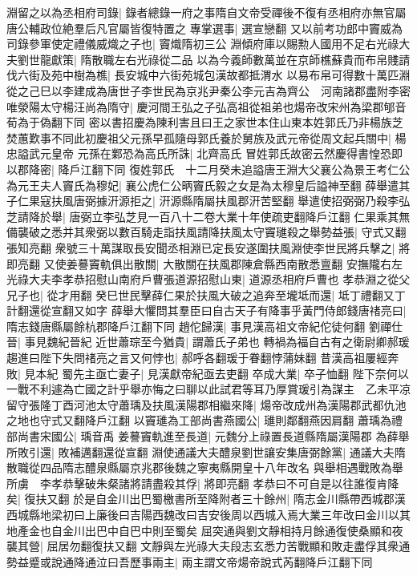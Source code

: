 淵留之以為丞相府司錄|{
	錄者總錄一府之事隋自文帝受禪後不復有丞相府亦無官屬唐公輔政位絶羣后凡官屬皆復特置之}
專掌選事|{
	選宣戀翻}
又以前考功郎中竇威為司錄參軍使定禮儀威熾之子也|{
	竇熾隋初三公}
淵傾府庫以賜勲人國用不足右光祿大夫劉世龍獻策|{
	隋散職左右光祿從二品}
以為今義師數萬並在京師樵蘇貴而布帛賤請伐六街及苑中樹為樵|{
	長安城中六街苑城包漢故都抵渭水}
以易布帛可得數十萬匹淵從之己巳以李建成為唐世子李世民為京兆尹秦公李元吉為齊公　河南諸郡盡附李密唯滎陽太守楊汪尚為隋守|{
	慶河間王弘之子弘高祖從祖弟也煬帝改宋州為梁郡郇音荀為于偽翻下同}
密以書招慶為陳利害且曰王之家世本住山東本姓郭氏乃非楊族芝焚蕙歎事不同此初慶祖父元孫早孤隨母郭氏養於舅族及武元帝從周文起兵關中|{
	楊忠謚武元皇帝}
元孫在鄴恐為高氏所誅|{
	北齊高氏}
冒姓郭氏故密云然慶得書惶恐即以郡降密|{
	降戶江翻下同}
復姓郭氏　十二月癸未追謚唐王淵大父襄公為景王考仁公為元王夫人竇氏為穆妃|{
	襄公虎仁公昞竇氏毅之女是為太穆皇后謚神至翻}
薛舉遣其子仁果寇扶風唐弼據汧源拒之|{
	汧源縣隋屬扶風郡汧苦堅翻}
舉遣使招弼弼乃殺李弘芝請降於舉|{
	唐弼立李弘芝見一百八十二卷大業十年使疏吏翻降戶江翻}
仁果乘其無備襲破之悉并其衆弼以數百騎走詣扶風請降扶風太守竇璡殺之舉勢益張|{
	守式又翻張知亮翻}
衆號三十萬謀取長安聞丞相淵已定長安遂圍扶風淵使李世民將兵擊之|{
	將即亮翻}
又使姜謩竇軌俱出散關|{
	大散關在扶風郡陳倉縣西南散悉亶翻}
安撫隴右左光祿大夫李孝恭招慰山南府戶曹張道源招慰山東|{
	道源丞相府戶曹也}
孝恭淵之從父兄子也|{
	從才用翻}
癸巳世民擊薛仁果於扶風大破之追奔至壠坻而還|{
	坻丁禮翻又丁計翻還從宣翻又如字}
薛舉大懼問其羣臣曰自古天子有降事乎黃門侍郎錢唐禇亮曰|{
	隋志錢唐縣屬餘杭郡降戶江翻下同}
趙佗歸漢|{
	事見漢高祖文帝紀佗徒何翻}
劉禪仕晉|{
	事見魏紀晉紀}
近世蕭琮至今猶貴|{
	謂蕭氏子弟也}
轉禍為福自古有之衛尉卿郝瑗趨進曰陛下失問禇亮之言又何悖也|{
	郝呼各翻瑗于眷翻悖蒲妹翻}
昔漢高祖屢經奔敗|{
	見本紀}
蜀先主亟亡妻子|{
	見漢獻帝紀亟去吏翻}
卒成大業|{
	卒子恤翻}
陛下奈何以一戰不利遽為亡國之計乎舉亦悔之曰聊以此試君等耳乃厚賞瑗引為謀主　乙未平凉留守張隆丁酉河池太守蕭瑀及扶風漢陽郡相繼來降|{
	煬帝改成州為漢陽郡武都仇池之地也守式又翻降戶江翻}
以竇璡為工部尚書燕國公|{
	璡則鄰翻燕因肩翻}
蕭瑀為禮部尚書宋國公|{
	瑀音禹}
姜謩竇軌進至長道|{
	元魏分上祿置長道縣隋屬漢陽郡}
為薛舉所敗引還|{
	敗補邁翻還從宣翻}
淵使通議大夫醴泉劉世讓安集唐弼餘黨|{
	通議大夫隋散職從四品隋志醴泉縣屬京兆郡後魏之寧夷縣開皇十八年改名}
與舉相遇戰敗為舉所虜　李孝恭擊破朱粲諸將請盡殺其俘|{
	將即亮翻}
孝恭曰不可自是以往誰復肯降矣|{
	復扶又翻}
於是自金川出巴蜀檄書所至降附者三十餘州|{
	隋志金川縣帶西城郡漢西城縣地梁初曰上廉後曰吉陽西魏改曰吉安後周以西城入焉大業三年改曰金川以其地產金也自金川出巴中自巴中則至蜀矣}
屈突通與劉文靜相持月餘通復使桑顯和夜襲其營|{
	屈居勿翻復扶又翻}
文靜與左光祿大夫段志玄悉力苦戰顯和敗走盡俘其衆通勢益蹙或說通降通泣曰吾歷事兩主|{
	兩主謂文帝煬帝說式芮翻降戶江翻下同}
